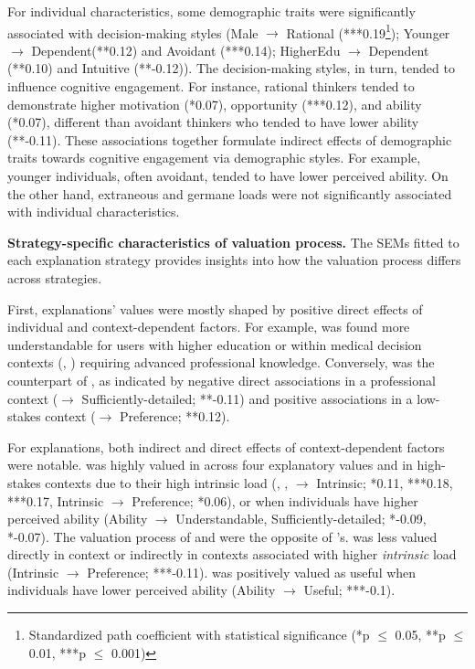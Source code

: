 For individual characteristics, some demographic traits were significantly associated with decision-making styles (Male $\rightarrow$ Rational (***0.19\footnote{Standardized path coefficient with statistical significance (*p $\leq$ 0.05, **p $\leq$ 0.01, ***p $\leq$ 0.001)}); Younger $\rightarrow$ Dependent(**0.12) and Avoidant (***0.14); HigherEdu $\rightarrow$ Dependent (**0.10) and Intuitive (**-0.12)). The decision-making styles, in turn, tended to influence cognitive engagement. For instance, rational thinkers tended to demonstrate higher motivation (*0.07), opportunity (***0.12), and ability (*0.07), different than avoidant thinkers who tended to have lower ability (**-0.11). These associations together formulate indirect effects of demographic traits towards cognitive engagement via demographic styles. For example, younger individuals, often avoidant, tended to have lower perceived ability. On the other hand, extraneous and germane loads were not significantly associated with individual characteristics.  

\textbf{Strategy-specific characteristics of valuation process.} The SEMs fitted to each explanation strategy provides insights into how the valuation process differs across strategies.

First, \comp explanations' values were mostly shaped by positive direct effects of individual and context-dependent factors. For example, \comp was found more understandable for users with higher education or within medical decision contexts (\mediP, \mediN) requiring advanced professional knowledge. Conversely, \ctt was the counterpart of \comp, as indicated by negative direct associations in a professional context (\mediP $\rightarrow$ Sufficiently-detailed; **-0.11) and positive associations in a low-stakes context (\recomN $\rightarrow$ Preference; **0.12). 

For \cf explanations, both indirect and direct effects of context-dependent factors were notable. \cf was highly valued in \loanN across four explanatory values and in high-stakes contexts due to their high intrinsic load (\mediN, \mediP, \drivN $\rightarrow$ Intrinsic; *0.11, ***0.18, ***0.17, Intrinsic $\rightarrow$ Preference; *0.06), or when individuals have higher perceived ability (Ability $\rightarrow$  Understandable, Sufficiently-detailed; *-0.09, *-0.07). The valuation process of \cbho and \cbhe were the opposite of \cf's. \cbho was less valued directly in \loanN context or indirectly in contexts associated with higher \textit{intrinsic} load (Intrinsic $\rightarrow$ Preference; ***-0.11). \cbhe was positively valued as useful when individuals have lower perceived ability (Ability $\rightarrow$ Useful; ***-0.1).